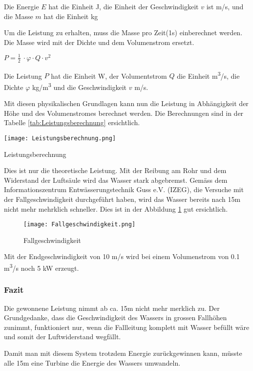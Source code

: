 Die Energie \(E\) hat die Einheit \si{J}, die Einheit der Geschwindigkeit \(v\) ist \si{m/s}, und die Masse \(m\) hat die Einheit \si{kg}

Um die Leistung zu erhalten, muss die Masse pro Zeit(1s) einberechnet werden. Die Masse wird  mit der Dichte und dem Volumenstrom ersetzt.

\begin{center}
\(P =\frac 12\ \cdot \varphi \cdot Q \cdot v^2\)
\end{center}

Die Leistung \(P\) hat die Einheit \si{W}, der Volumentstrom \(Q\) die Einheit \si{m^3/s}, die Dichte \(\varphi\)  \si{kg/m^3} und die Geschwindigkeit \(v\)  \si{m/s}.

\bigskip


Mit diesen physikalischen Grundlagen kann nun die Leistung in Abhängigkeit der Höhe und des Volumenstromes berechnet werden.  Die Berechnungen sind in der Tabelle  \ref{tab:Leistungsberechnung}  ersichtlich.

\begin{table} [H]
	\centering
	\texttt{[image: Leistungsberechnung.png]}
	\caption{Leistungsberechnung}
	\label{tab:Leistungsberechnung}
\end{table}

\newpage

Dies ist nur die theoretische Leistung. Mit der Reibung am Rohr und dem Widerstand der Luftsäule wird das Wasser stark abgebremst. Gemäss dem Informationszentrum Entwässerungstechnik Guss e.V. (IZEG), die Versuche mit der Fallgeschwindigkeit durchgeführt haben, wird das Wasser bereits nach 15\si{m} nicht mehr mehrklich schneller. Dies ist in der Abbildung \ref{fig:Fallgeschwindigkeit}  gut ersichtlich.

\begin{figure} [H]
	\centering
	\texttt{[image: Fallgeschwindigkeit.png]}
	\caption{Fallgeschwindigkeit \cite{Izeg}}
	\label{fig:Fallgeschwindigkeit}
\end{figure}


Mit der Endgeschwindigkeit von 10 \si{m/s} wird bei einem Volumenstrom von 0.1 \si{m^3/s} noch 5 \si{kW} erzeugt.

\subsubsection{Fazit}

Die gewonnene Leistung nimmt ab ca. 15\si{m} nicht mehr merklich zu. Der Grundgedanke, dass die Geschwindigkeit des Wassers in grossen Fallhöhen zunimmt, funktioniert nur, wenn die Fallleitung komplett mit Wasser befüllt wäre und somit der Luftwiderstand wegfällt.

Damit man mit diesem System trotzdem Energie zurückgewinnen kann, müsste alle 15\si{m} eine Turbine die Energie des Wassers umwandeln.

\clearpage 





